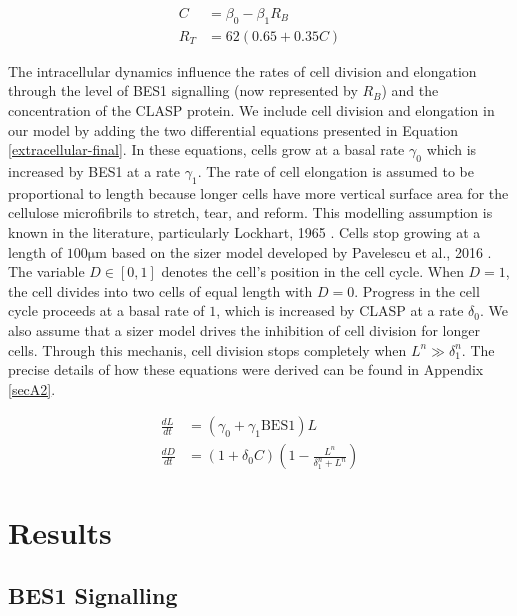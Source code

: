 \documentclass[referee,pdflatex,sn-mathphys-num]{sn-jnl}
\newcommand{\um}{\unit{\micro\metre}}
\begin{document}
\begin{equation}
\label{intracellular-final}
\begin{aligned}
  C &= \beta_{0} - \beta_{1}R_{B} \\[5pt]
  R_{T} &= 62 (0.65 + 0.35 C)
\end{aligned}
\end{equation}

The intracellular dynamics influence the rates of cell division and elongation through the level of BES1 signalling (now represented by $R_{B}$) and the concentration of the CLASP protein.
We include cell division and elongation in our model by adding the two differential equations presented in Equation \eqref{extracellular-final}.
In these equations, cells grow at a basal rate $\gamma_{0}$ which is increased by BES1 at a rate $\gamma_{1}$.
The rate of cell elongation is assumed to be proportional to length because longer cells have more vertical surface area for the cellulose microfibrils to stretch, tear, and reform.
This modelling assumption is known in the literature, particularly Lockhart, 1965 \cite{lockhart1965}.
Cells stop growing at a length of $100\um$ based on the sizer model developed by Pavelescu et al., 2016 \cite{pavelescu2016}.
The variable $D \in [0, 1]$ denotes the cell's position in the cell cycle.
When $D = 1$, the cell divides into two cells of equal length with $D = 0$.
Progress in the cell cycle proceeds at a basal rate of $1$, which is increased by CLASP at a rate $\delta_{0}$.
We also assume that a sizer model drives the inhibition of cell division for longer cells.
Through this mechanis, cell division stops completely when $L^{n} \gg \delta_{1}^{n}$.
The precise details of how these equations were derived can be found in Appendix \ref{secA2}.

\begin{equation}
\label{extracellular-final}
\begin{aligned}
  \frac{ dL }{ dt } &= \left(\gamma_{0} + \gamma_{1}\text{BES1}\right)L  \\[5pt]
\frac{ dD }{ dt } &= (1 + \delta_{0}C)\left( 1 - \frac{ L^{ n } }{ \delta_{1}^{ n } + L^{ n } } \right) 
\end{aligned}
\end{equation}

\section{Results}\label{sec2}

\subsection{BES1 Signalling}\label{sec21}
\end{document}

